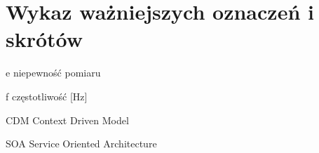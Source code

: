 \chapter*{Wykaz ważniejszych oznaczeń i skrótów}

\begin{abbrev}
\item[e] niepewność pomiaru
\item[f] częstotliwość [Hz]
\item[CDM] Context Driven Model
\item[SOA] Service Oriented Architecture
\end{abbrev}

